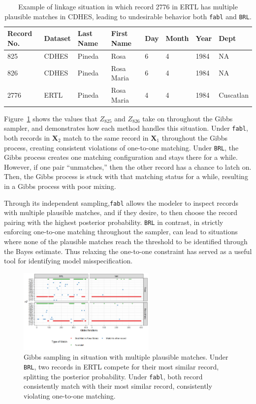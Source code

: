 \documentclass[12pt,letterpaper]{article}
\newcommand{\1}[1]{\mathbb{I}\!\left[#1\right]} %
\begin{document}
\begin{table}
	\centering
	\begin{tabular}[h!]{llllllll}
		\hline
		Record No. & Dataset & Last Name & First Name & Day & Month & Year & Dept \\
		\hline
		825 & CDHES & Pineda & Rosa & 6 & 4 & 1984 & NA\\
		826 & CDHES & Pineda & Rosa Maria & 6 & 4 & 1984 & NA\\
		2776 & ERTL & Pineda & Rosa Maria & 4 & 4 & 1984 & Cuscatlan\\
		\hline
	\end{tabular}
	\caption{Example of linkage situation in which record 2776 in ERTL has multiple plausible matches in CDHES, leading to undesirable behavior both \texttt{fabl} and \texttt{BRL}.}\label{Tab:rosa-maria}
\end{table}

Figure~\ref{fig:mixing-plot} shows the values that $Z_{825}$ and $Z_{826}$ take on throughout the Gibbs sampler, and demonstrates how each method handles this situation. Under \texttt{fabl}, both records in $\bm{X}_2$ match to the same record in $\bm{X}_1$ throughout the Gibbs process, creating consistent violations of one-to-one matching. Under \texttt{BRL}, the Gibbs process creates one matching configuration and stays there for a while. However, if one pair ``unmatches,'' then the other record has a chance to latch on. Then, the Gibbs process is stuck with that matching status for a while, resulting in a Gibbs process with poor mixing. 

Through its independent sampling,\texttt{fabl} allows the modeler to inspect records with multiple plausible matches, and if they desire, to then choose the record pairing with the highest posterior probability. \texttt{BRL} in contrast, in strictly enforcing one-to-one matching throughout the sampler, can lead to situations where none of the plausible matches reach the threshold to be identified through the Bayes estimate. Thus relaxing the one-to-one constraint has served as a useful tool for identifying model misspecification. 

\begin{figure}[h!]
\begin{center}
\includegraphics[width=0.6\textwidth]{../notes/figures/el_salvador/bad_mixing} 
\caption{Gibbs sampling in situation with multiple plausible matches. Under \texttt{BRL}, two records in ERTL compete for their most similar record, splitting the posterior probability. Under \texttt{fabl}, both record consistently match with their most similar record, consistently violating one-to-one matching.} \label{fig:mixing-plot}
\end{center}
\end{figure}
\end{document}
